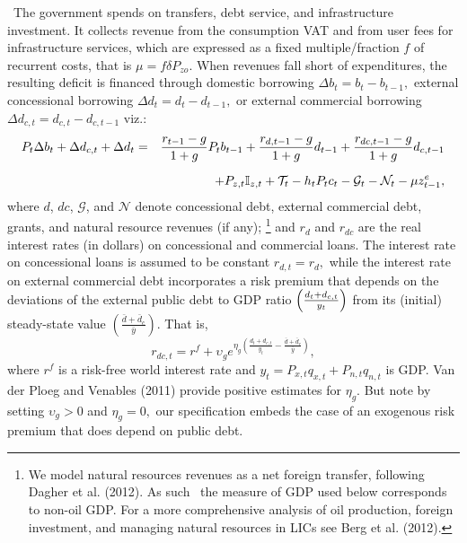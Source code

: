 \documentclass[11pt]{article}
\begin{document}
\quad\ \thinspace The government spends on transfers, debt service, and
infrastructure investment. It collects revenue from the consumption VAT and
from user fees for infrastructure services, which are expressed as a fixed
multiple/fraction $f$ of recurrent costs, that is $\mu =f\delta P_{zo}$.
When revenues fall short of expenditures, the resulting deficit is financed
through domestic borrowing $\Delta b_{t}=b_{t}-b_{t-1},$ external
concessional borrowing $\Delta d_{t}=d_{t}-d_{t-1},$ or external commercial
borrowing $\Delta d_{c,t}=d_{c,t}-d_{c,t-1}$ viz.: 
\begin{eqnarray}
P_{t}\Delta b_{t}+\Delta d_{c,t}+\Delta d_{t} &=&\frac{r_{t-1}-g}{1+g}%
P_{t}b_{t-1}+\frac{r_{d,t-1}-g}{1+g}d_{t-1}+\frac{r_{dc,t-1}-g}{1+g}d_{c,t-1}
\label{Gov_BC} \\[0.08in]
&&+P_{z,t}\mathbb{I}_{z,t}+\mathcal{T}_{t}-h_{t}P_{t}c_{t}-\mathcal{G}_{t}-%
\mathcal{N}_{t}-\mu z_{t-1}^{e},  \notag
\end{eqnarray}%
where $d$, $dc$, $\mathcal{G}$, and $\mathcal{N}$ denote concessional debt,
external commercial debt, grants, and natural resource revenues (if any);%
\footnote{%
We model natural resources revenues as a net foreign transfer, following
Dagher et al. (2012). As such \ the measure of GDP used below corresponds to
non-oil GDP. For a more comprehensive analysis of oil production, foreign
investment, and managing natural resources in LICs see Berg et al. (2012).}
and $r_{d}$ and $r_{dc}$ are the real interest rates (in dollars) on
concessional and commercial loans. The interest rate on concessional loans
is assumed to be constant $r_{d,t}=r_{d},$ while the interest rate on
external commercial debt incorporates a risk premium that depends on the
deviations of the external public debt to GDP ratio $\left( \frac{%
d_{t}+d_{c,t}}{y_{t}}\right) $ from its (initial) steady-state value $\left( 
\frac{\bar{d}+\bar{d}_{c}}{\bar{y}}\right) $. That is, 
\begin{equation}
r_{dc,t}=r^{f}+\upsilon _{g}e^{\eta _{g}\left( \frac{d_{t}+d_{c,t}}{y_{t}}-%
\frac{\bar{d}+\bar{d}_{c}}{\bar{y}}\right) },  \label{rdc}
\end{equation}%
where $r^{f}$ is a risk-free world interest rate and $%
y_{t}=P_{x,t}q_{x,t}+P_{n,t}q_{n,t}$ is GDP. Van der Ploeg and Venables
(2011) provide positive estimates for $\eta _{g}$. But note by setting $%
\upsilon _{g}>0$ and $\eta _{g}=0,$ our specification embeds the case of an
exogenous risk premium that does depend on public debt.
\end{document}
